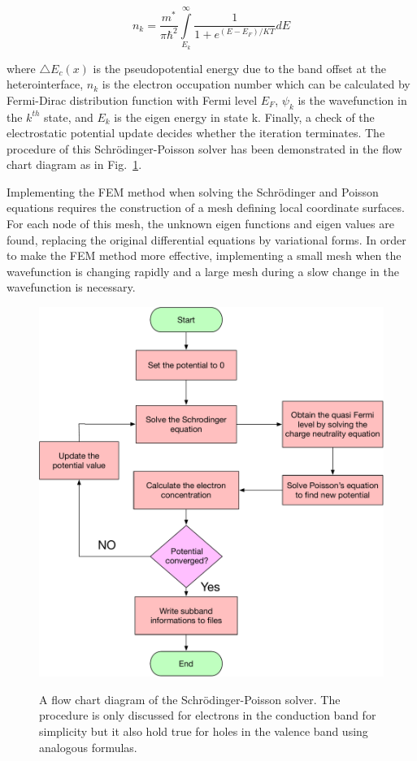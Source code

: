 \begin{equation}
  n_k = \frac{m^\ast}{\pi\hbar^2}{\int\limits_{E_k}^{\infty}}\frac{1}{1+e^{(E-E_F)/KT}}dE
  \label{eq:EO}
\end{equation}

where $\triangle{E_c(x)}$ is the pseudopotential energy due to the band offset
at the heterointerface, $n_k$ is the electron occupation number which can be
calculated by Fermi-Dirac distribution function with Fermi level $E_F$,
$\psi_k$ is the wavefunction in the $k^{th}$ state, and $E_k$ is the eigen
energy in state k. Finally, a check of the electrostatic potential update
decides whether the iteration terminates. The procedure of this
Schr{\"o}dinger-Poisson solver has been demonstrated in the flow chart diagram
as in Fig.~\ref{SchrodingerPoissonSolver}.

Implementing the FEM method when solving the Schr{\"o}dinger and Poisson
equations requires the construction of a mesh defining local coordinate
surfaces. For each node of this mesh, the unknown eigen functions and eigen
values are found, replacing the original differential equations by variational
forms. In order to make the FEM method more effective, implementing a small
mesh when the wavefunction is changing rapidly and a large mesh during a slow
change in the wavefunction is necessary.

\begin{figure}
  \caption{A flow chart diagram of the Schr{\"o}dinger-Poisson solver. The procedure is only discussed for electrons in the conduction band for simplicity but it also hold true for holes in the valence band using analogous formulas.}
  \centering
  \includegraphics[width=\textwidth]{pictures/ED/SchrodingerPoissonSolver}
  \label{SchrodingerPoissonSolver}
\end{figure}

